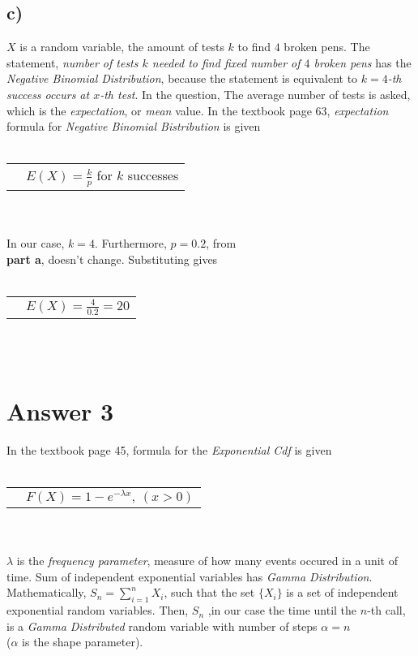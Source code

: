 \documentclass[12pt]{article}
\begin{document}
\subsection*{c)}
$X$ is a random variable, the amount of tests $k$ to find 
$4$ broken pens. The statement, \textit{number of tests $k$ needed to find fixed number of $4$ broken pens}
has the \textit{Negative Binomial Distribution}, because the statement is 
equivalent to \textit{$k=4$-th success occurs at $x$-th test}.
In the question, The average number of tests is asked, which is the 
\hypertarget{expect}{\textit{expectation}}, or \textit{mean} value.
In the textbook page 63, \textit{expectation} formula
for \textit{Negative Binomial Bistribution} is given
\\ \\
\begin{tabular}{l l}
    &$E(X) = \frac{k}{p} $ for $k$ successes\\ 
\end{tabular}
\\ \\
In our case, $k=4$. Furthermore, $p=0.2$, from\\ \textbf{part a}, doesn't change. Substituting gives
\\ \\
\begin{tabular}{l l}
    &$E(X) = \frac{4}{0.2} = 20 $\\ 
\end{tabular}
\\ \\ 
\section*{Answer 3}
In the textbook page 45, formula for the \hypertarget{exp}{\textit{Exponential Cdf}} is given
\\ \\
\begin{tabular}{l l}
    &$F(X) = 1-e^{-\lambda x},\ (x>0) $ \hypertarget{freq}{}\\ 
\end{tabular}
\\ \\
$\lambda$ is the \textit{frequency parameter}, 
measure of how many events occured in a unit of time.
Sum of independent exponential variables has
\textit{Gamma Distribution}. Mathematically,
$S_n=\sum\limits_{i=1}^nX_i$, such that the set $\{X_i\}$ is
a set of independent exponential random variables.
Then, $S_n$ ,in our case the time until the $n$-th call,
is a \textit{Gamma Distributed} random variable with number of steps 
$\alpha=n$ \\($\alpha$ is the shape parameter).
\end{document}

